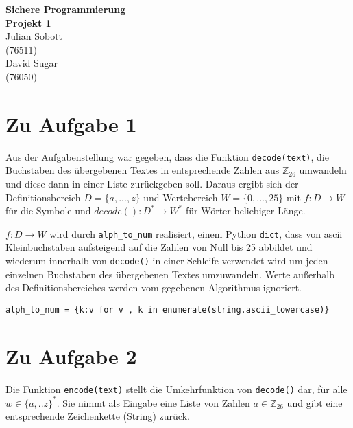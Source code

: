 \documentclass[12pt]{article}
\begin{document}
\begin{center}
  \textbf{\LARGE Sichere Programmierung} \\[1ex]%
  \textbf{\Large Projekt 1}\\[2ex] %
  Julian Sobott \\ %
  (76511) \\ %
  David Sugar \\ %
  (76050) \\ %
  
\end{center}

\section{Zu Aufgabe 1}
Aus der Aufgabenstellung war gegeben, dass die Funktion \texttt{decode(text)}, die Buchstaben des übergebenen Textes in entsprechende Zahlen aus $\mathbb{Z}_{26}$ umwandeln und diese dann in einer Liste zurückgeben soll. Daraus ergibt sich der Definitionsbereich $D = \{a,...,z\}$ und Wertebereich $W = \{0,...,25\}$ mit $f: D \to W$ für die Symbole und $decode(): D^{*} \to W^{*}$ für Wörter beliebiger Länge.  

$f: D \to W$ wird durch \texttt{alph\_to\_num} realisiert, einem Python \texttt{dict}, dass von ascii Kleinbuchstaben aufsteigend auf die Zahlen von Null bis 25 abbildet und wiederum innerhalb von \texttt{decode()} in einer Schleife verwendet wird um jeden einzelnen Buchstaben des übergebenen Textes umzuwandeln. Werte außerhalb des Definitionsbereiches werden vom gegebenen Algorithmus ignoriert.
\begin{lstlisting}
alph_to_num = {k:v for v , k in enumerate(string.ascii_lowercase)}
\end{lstlisting}




\section{Zu Aufgabe 2}
Die Funktion \texttt{encode(text)} stellt die Umkehrfunktion von \texttt{decode()} dar, für alle $w \in \{a,..z\}^{*}$. Sie nimmt als Eingabe eine Liste von Zahlen $a \in \mathbb{Z}_{26}$ und gibt eine entsprechende Zeichenkette (String) zurück.
\end{document}
